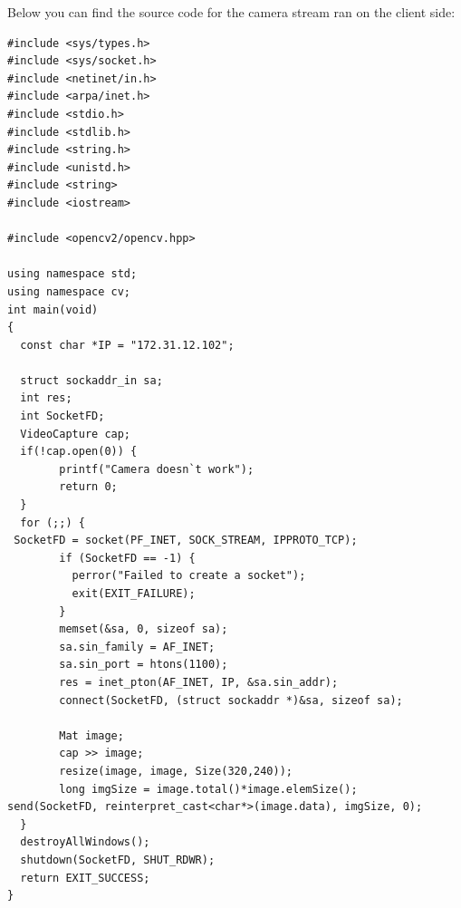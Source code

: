 \documentclass[conference]{IEEEtran}
\begin{document}
Below you can find the source code for the camera stream ran on the client side:
\begin{lstlisting}
#include <sys/types.h>
#include <sys/socket.h>
#include <netinet/in.h>
#include <arpa/inet.h>
#include <stdio.h>
#include <stdlib.h>
#include <string.h>
#include <unistd.h>
#include <string>
#include <iostream>

#include <opencv2/opencv.hpp>

using namespace std;
using namespace cv;
int main(void)
{
  const char *IP = "172.31.12.102";
  
  struct sockaddr_in sa;
  int res;
  int SocketFD;
  VideoCapture cap;
  if(!cap.open(0)) {
        printf("Camera doesn`t work");
        return 0;
  }
  for (;;) {
 SocketFD = socket(PF_INET, SOCK_STREAM, IPPROTO_TCP);
        if (SocketFD == -1) {
          perror("Failed to create a socket");
          exit(EXIT_FAILURE);
        } 
        memset(&sa, 0, sizeof sa);
        sa.sin_family = AF_INET;
        sa.sin_port = htons(1100);
        res = inet_pton(AF_INET, IP, &sa.sin_addr);
        connect(SocketFD, (struct sockaddr *)&sa, sizeof sa);
        
        Mat image;
        cap >> image;
        resize(image, image, Size(320,240));
        long imgSize = image.total()*image.elemSize();
send(SocketFD, reinterpret_cast<char*>(image.data), imgSize, 0);
  }
  destroyAllWindows();
  shutdown(SocketFD, SHUT_RDWR);
  return EXIT_SUCCESS;
}
\end{lstlisting}
\end{document}
